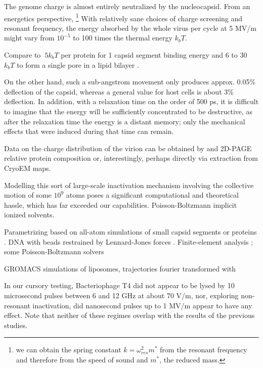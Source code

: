 \documentclass[paper.tex]{subfiles}
\begin{document}
The genome charge is almost entirely neutralized by the nucleocapsid. From an energetics perspective, \footnote{we can obtain the spring constant $k = \omega_{res}^2 m^*$ from the resonant frequency and therefore from the speed of sound and $m^*$, the reduced mass.} With relatively sane choices of charge screening and resonant frequency, the energy absorbed by the whole virus per cycle at 5 MV/m might vary from $10^{-5}$ to 100 times the thermal energy $k_b T$.

Compare to $~5 k_b T$ per protein for 1 capsid segment binding energy \cite{Energies2012} \cite{Weak2002} and 6 to 30 $k_b T$ to form a single pore in a lipid bilayer \cite{Atomistic2014}.

On the other hand, such a sub-angstrom movement only produces approx. 0.05\% deflection of the capsid, whereas a general value for host cells is about 3\% deflection. In addition, with a relaxation time on the order of 500 ps, it is difficult to imagine that the energy will be sufficiently concentrated to be destructive, as after the relaxation time the energy is a distant memory; only the mechanical effects that were induced during that time can remain.

Data on the charge distribution of the virion can be obtained by and 2D-PAGE relative protein composition or, interestingly, perhaps directly via extraction from CryoEM maps.



Modelling this sort of large-scale inactivation mechanism involving the collective motion of some $10^9$ atoms poses a significant computational and theoretical hassle, which has far exceeded our capabilities. Poisson-Boltzmann implicit ionized solvents.

Parametrizing based on all-atom simulations of small capsid segments or proteins \cite{Elucidating2009}. DNA with beads restrained by Lennard-Jones forces \cite{Communication2013}. Finite-element analysis \cite{Finite2008}; some Poisson-Boltzmann solvers

GROMACS simulations of liposomes, trajectories fourier transformed with \cite{TRAVIS2011}

In our cursory testing, Bacteriophage T4 did not appear to be lysed by 10 microsecond pulses between 6 and 12 GHz at about 70 V/m, nor, exploring non-resonant inactivation, did nanosecond pulses up to 1 MV/m appear to have any effect. Note that neither of these regimes overlap with the results of the previous studies.
\end{document}
